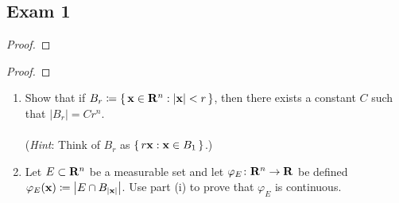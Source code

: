 \subsection{Exam 1}

\begin{problem}
\end{problem}
\begin{proof}
\end{proof}

\begin{problem}
\end{problem}
\begin{proof}
\end{proof}

\begin{problem}
\hfill
\begin{enumerate}[label=(\roman*)]
\item Show that if $B_r\coloneqq\left\{\,\mathbf{x}\in\mathbf{R}^n:|\mathbf{x}|<r\,\right\}$,
  then there exists a constant $C$ such that $|B_r|=Cr^n$.
\\\\
(\emph{Hint}: Think of $B_r$ as $\left\{\,r\mathbf{x}:\mathbf{x}\in B_1\,\right\}$.)
\item Let $E\subset\mathbf{R}^n$ be a measurable set and let
  $\varphi_E\colon\mathbf{R}^n\to\mathbf{R}$ be defined
  $\varphi_E(\mathbf{x})\coloneqq\left|E\cap B_{|\mathbf{x}|}\right|$. Use part (i) to prove
    that $\varphi_E$ is continuous.
\end{enumerate}
\end{problem}
